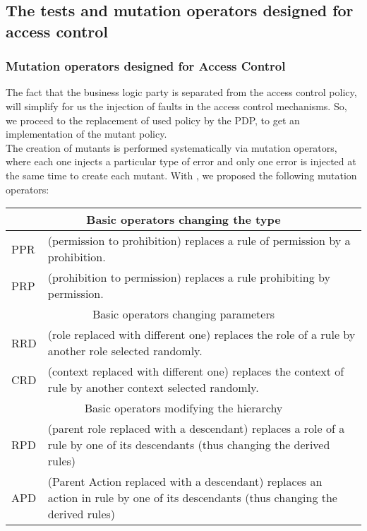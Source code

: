 \documentclass{acm_proc_article-sp}
\begin{document}
\subsection{The tests and mutation operators designed for access control}
\subsubsection{Mutation operators designed for Access Control}
The fact that the business logic party is separated from the access control policy, will simplify for us the injection of faults in the access control mechanisms. So, we proceed to the replacement of used policy by the PDP, to get an implementation of the mutant policy.\\
The creation of mutants is performed systematically via mutation operators, where each one injects a particular type of error and only one error is injected at the same time to create each mutant. With \cite{Tej}, we proposed the following mutation operators:
\begin{center}
\begin{tabular}{|p{1cm}|p{7cm}|}
  \hline
  \multicolumn{2}{|c|}{Basic operators changing the type} \\\hline
  PPR & (permission to prohibition) replaces a rule of permission by a prohibition.\\ \hline
  PRP & (prohibition to permission) replaces a rule prohibiting by permission.\\ \hline

  \multicolumn{2}{|c|}{Basic operators changing parameters} \\ \hline
  RRD & (role replaced with different one) replaces the role of a rule by another role selected randomly.\\ \hline
  CRD & (context replaced with different one) replaces the context of rule by another context selected randomly.\\ \hline

  \multicolumn{2}{|c|}{Basic operators modifying the hierarchy} \\ \hline
  RPD & (parent role replaced with a descendant) replaces a role of a rule by one of its descendants (thus changing the derived rules)\\ \hline
  APD & (Parent Action replaced with a descendant) replaces an action in rule by one of its descendants (thus changing the derived rules) \\ \hline
\end{tabular}
\end{center}
\end{document}
